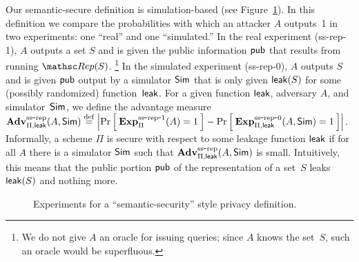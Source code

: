 

Our semantic-secure definition is simulation-based (see Figure~\ref{fig:privacy-ss}).
In this definition we compare the probabilities with which an attacker $A$ outputs~1
in two experiments: one ``real'' and one ``simulated.''
In the real experiment (ss-rep-1), $A$ outputs a set $S$  and is given the
public information ${\sf pub}$ that results from running $\Rep(S)$.
\footnote{We do not give $A$ an oracle for issuing queries;
since $A$ knows the set~$S$, such an oracle would be superfluous.
}
In the simulated experiment (ss-rep-0), $A$ outputs $S$ and is given ${\sf pub}$ output
by a simulator ${\sf Sim}$ that is only given ${\sf leak}(S)$ for some (possibly randomized)
function~${\sf leak}$.
For a given function ${\sf leak}$, adversary $A$, and simulator~${\sf Sim}$,
we define the advantage measure
$\mathrm{\mathbf{Adv}}^{\mathrm{ss\mbox{-}rep}}_{\Pi,{\sf leak}}(A,{\sf Sim}) \stackrel{\rm def}{=}
\left| \Pr\left[\: \mathrm{\mathbf{Exp}}^{\mathrm{ss\mbox{-}rep\mbox{-}1}}_{\Pi}(A)=1 \:\right] -
\Pr\left[\: \mathrm{\mathbf{Exp}}^{\mathrm{ss\mbox{-}rep\mbox{-}0}}_{\Pi,{\sf leak}}(A, {\sf Sim})=1 \:\right] \right|$.
Informally, a scheme $\Pi$ is secure with respect to some leakage function ${\sf leak}$
if for all $A$ there is a simulator ${\sf Sim}$ such that
$\mathrm{\mathbf{Adv}}^{\mathrm{ss\mbox{-}rep}}_{\Pi,{\sf leak}}(A,{\sf Sim})$ is small.
Intuitively, this means that the public portion
${\sf pub}$ of the representation of a set~$S$ leaks~${\sf leak}(S)$ and nothing more.
\begin{figure}[hbtp]
\centering
{}
\caption{Experiments for a ``semantic-security'' style privacy
  definition.}
\label{fig:privacy-ss}
\end{figure}

